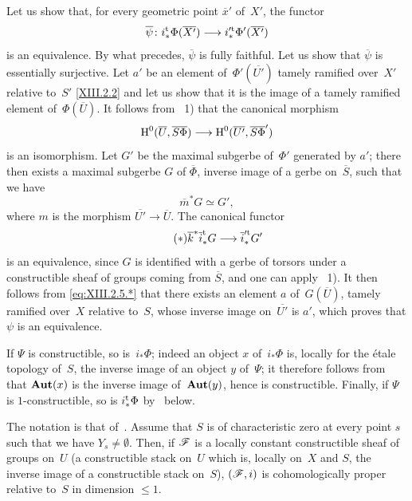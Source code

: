 Let us show
that, for every geometric point $\overline{x}'$ of~$X'$, the
functor
$$
\overline{\psi}\colon i^{\tame}_*\Phi(\overline{X'})\to
i_*^{\prime\tame}\Phi'(\overline{X'})
$$
is an equivalence. By what precedes,
$\overline{\psi}$ is fully faithful. Let us show that
$\overline{\psi}$ is essentially surjective. Let $a'$ be an
element of~$\Phi'(\overline{U'})$ tamely
ramified over~$X'$ relative to~$S'$ \eqref{XIII.2.2} and
let us show that it is the image of a tamely
ramified element of~$\Phi(\overline{U})$. It follows from~
1) that the canonical morphism
$$
\H^0(\overline{U},\overline{S}\overline{\Phi})\to
\H^0(\overline{U'},\overline{S}\overline{\Phi}')
$$
is an isomorphism. Let $G'$ be the maximal subgerbe of~$\Phi'$
generated by $a'$; there then exists a maximal subgerbe $G$ of
$\overline{\Phi}$, inverse image of a gerbe on~$\overline{S}$, such
that we have
$$
\overline{m}^*G\simeq G',
$$
where $m$ is the morphism $\overline{U'}\to
\overline{U}$. The canonical functor
\begin{equation*}
\label{eq:XIII.2.5.*}
\tag{$*$} {\overline{k}^*\overline{i}_*^{\tame}G\to
\overline{i}_*^{\prime\tame}G'}
\end{equation*}
is an equivalence, since $G$ is identified with a gerbe of
torsors under a constructible sheaf of groups coming from
$\overline{S}$, and one can apply ~1). It
then follows from \eqref{eq:XIII.2.5.*} that there exists an
element $a$ of~$G(\overline{U})$, tamely
ramified over~$X$ relative to~$S$, whose inverse image on~$\overline{U'}$ is $a'$, which proves that $\psi$ is an
equivalence.

If $\Psi$ is constructible, so is~$i_*\Phi$; indeed
an object $x$ of~$i_*\Phi$ is, locally for the
\'etale topology of~$S$, the inverse image of an object $y$ of~$\Psi$; it
therefore follows from~ that $\operatorname{\mathbf{Aut}} (x)$ is
the inverse image of~$\operatorname{\mathbf{Aut}} (y)$, hence is constructible. Finally, if
$\Psi$ is $1$-constructible, so is
$i^{\mathrm{t}}_*\Phi$ by~ below.

\begin{corollary}
\label{XIII.2.6}
The
notation is that of~. Assume that $S$ is of
characteristic zero at every point $s$ such that we have $Y_s\neq
\emptyset.$ Then, if $\cal{ F}$ is a locally
constant constructible sheaf of groups on~$U$ (\resp a constructible stack on~$U$ which
is, locally on~$X$ and $S$, the inverse image of a constructible stack
on~$S$), $(\cal{ F},i)$ is cohomologically proper relative
to~$S$ in dimension $\leq 1.$
\end{corollary}

